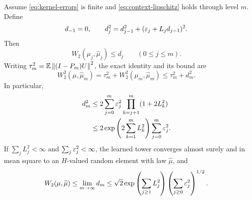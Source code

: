 \begin{theorem}\label{thm:certificate}
Assume \eqref{eq:kernel-errors} is finite and \eqref{eq:context-lipschitz} holds through level $m$. Define
\begin{equation}\label{eq:sharp-recurrence}
 d_{-1}=0,\qquad d_j^2=d_{j-1}^2+(\varepsilon_j+L_jd_{j-1})^2.
\end{equation}
Then
\begin{equation}\label{eq:finite-certificate}
 W_2(\mu_j,\widehat\mu_j)\le d_j\qquad (0\le j\le m).
\end{equation}
Writing $\tau_m^2=\mathbb E\left\lVert(I-P_m)U\right\rVert^2$, the exact identity and its bound are
\begin{equation}\label{eq:pythagorean-certificate}
 W_2^2(\mu,\widehat\mu_m)
 =\tau_m^2+W_2^2(\mu_m,\widehat\mu_m)
 \le\tau_m^2+d_m^2.
\end{equation}
In particular,
\begin{align}\label{eq:sum-certificate}
 d_m^2&\le 2\sum_{j=0}^m\varepsilon_j^2
                \prod_{k=j+1}^m(1+2L_k^2)\notag\\
 &\le 2\exp\left(2\sum_{k=1}^mL_k^2\right)\sum_{j=0}^m\varepsilon_j^2.
\end{align}
If $\sum_jL_j^2<\infty$ and $\sum_j\varepsilon_j^2<\infty$, the learned tower converges almost surely and in mean square to an $H$-valued random element with law $\widehat\mu$, and
\begin{equation}\label{eq:infinite-certificate}
 W_2(\mu,\widehat\mu)
 \le \lim_{m\to\infty}d_m
 \le\sqrt2\exp\left(\sum_{j\ge1}L_j^2\right)
             \left(\sum_{j\ge0}\varepsilon_j^2\right)^{1/2}.
\end{equation}
\end{theorem}
